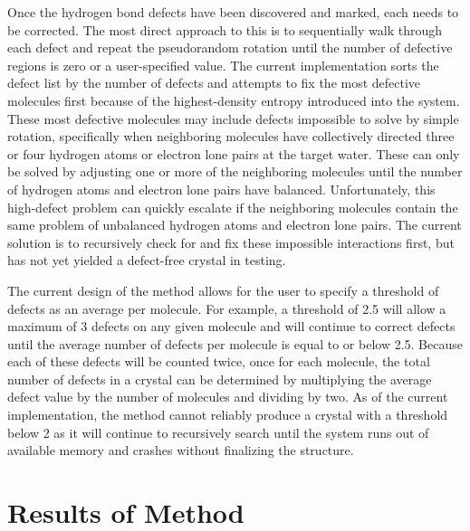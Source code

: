 Once the hydrogen bond defects have been discovered and marked, each needs to be corrected.
The most direct approach to this is to sequentially walk through each defect and repeat the pseudorandom rotation until the number of defective regions is zero or a user-specified value.
The current implementation sorts the defect list by the number of defects and attempts to fix the most defective molecules first because of the highest-density entropy introduced into the system.
These most defective molecules may include defects impossible to solve by simple rotation, specifically when neighboring molecules have collectively directed three or four hydrogen atoms or electron lone pairs at the target water. 
These can only be solved by adjusting one or more of the neighboring molecules until the number of hydrogen atoms and electron lone pairs have balanced.
Unfortunately, this high-defect problem can quickly escalate if the neighboring molecules contain the same problem of unbalanced hydrogen atoms and electron lone pairs. 
The current solution is to recursively check for and fix these impossible interactions first, but has not yet yielded a defect-free crystal in testing.

The current design of the method allows for the user to specify a threshold of defects as an average per molecule. 
For example, a threshold of 2.5 will allow a maximum of 3 defects on any given molecule and will continue to correct defects until the average number of defects per molecule is equal to or below 2.5.
Because each of these defects will be counted twice, once for each molecule, the total number of defects in a crystal can be determined by multiplying the average defect value by the number of molecules and dividing by two.
As of the current implementation, the method cannot reliably produce a crystal with a threshold below 2 as it will continue to recursively search until the system runs out of available memory and crashes without finalizing the structure.

\section{Results of Method}

